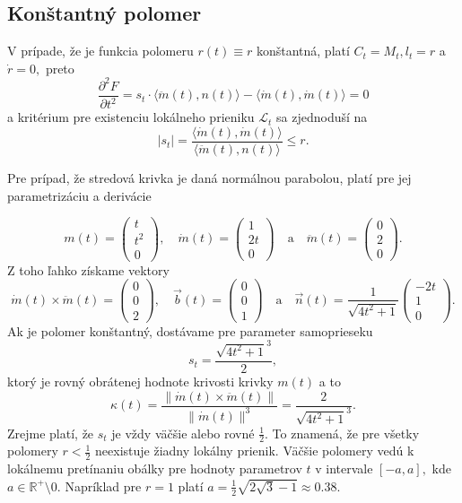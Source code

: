 \subsection{Konštantný polomer}
V prípade, že je funkcia polomeru $r(t) \equiv r $ konštantná, platí $C_t = M_t,  l_t = r$ a $\dot{r} = 0,$ preto 
$$\dfrac{\partial^2 F}{\partial t^2} = s_t \cdot \langle \ddot{m}(t), n(t) \rangle - \langle \dot{m}(t), \dot{m}(t) \rangle = 0$$
a kritérium pre existenciu lokálneho prieniku $\mathcal{L}_t$ sa zjednoduší na
$$
\lvert s_t \rvert = \frac{\langle \dot{m}(t), \dot{m}(t) \rangle}{\langle \ddot{m}(t), n(t) \rangle} \leq r.
$$
\begin{example}
Pre prípad, že stredová krivka je daná normálnou parabolou, platí pre jej parametrizáciu a derivácie

\[
m(t) = \begin{pmatrix} t \\ t^2 \\ 0 \end{pmatrix}, \quad \dot{m}(t) = \begin{pmatrix} 1 \\ 2t \\ 0 \end{pmatrix} \quad \text{a} \quad \ddot{m}(t) = \begin{pmatrix} 0 \\ 2 \\ 0 \end{pmatrix}.
\]
Z toho ľahko získame vektory 
$$ \dot{m}(t) \times \ddot{m}(t) =
\begin{pmatrix} 0 \\ 0 \\ 2 \end{pmatrix} , \quad \vec{b}(t) = \begin{pmatrix} 0 \\ 0 \\ 1 \end{pmatrix} \quad  \text{a} \quad \vec{n}(t) = \dfrac{1}{\sqrt{4t^2 + 1}} \begin{pmatrix} -2t \\ 1 \\ 0 \end{pmatrix}.$$
Ak je polomer konštantný, dostávame pre parameter samoprieseku
$$ s_t = \dfrac{\sqrt{4t^2 + 1}^3}{2}, $$
ktorý je rovný obrátenej hodnote krivosti krivky $m(t)$ a to
$$ \kappa(t) = \frac{\lVert  \dot{m}(t) \times \ddot{m}(t) \rVert}{\lVert \dot{m}(t) \rVert^3} = \frac{2}{\sqrt{4t^2 + 1}^3}. $$
Zrejme platí, že $s_t$ je vždy väčšie alebo rovné $\frac{1}{2}$. To znamená, že pre všetky polomery $r < \frac{1}{2}$ neexistuje žiadny lokálny prienik. Väčšie polomery vedú k lokálnemu pretínaniu obálky pre hodnoty parametrov $t$ v intervale $[-a, a],$ kde $a \in \mathbb{R}^+ \setminus {0}$. Napríklad pre $r = 1$ platí $a = \frac{1}{2} \sqrt{2 \sqrt{3} - 1} \approx 0.38$.
\end{example}

